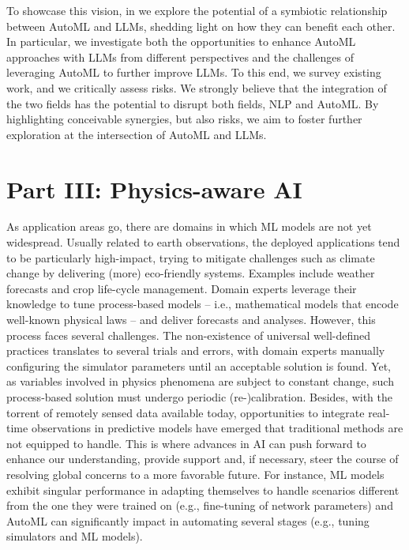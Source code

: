 To showcase this vision, in  we explore the potential of a symbiotic relationship between AutoML and LLMs, shedding light on how they can benefit each other.
In particular, we investigate both the opportunities to enhance AutoML approaches with LLMs from different perspectives and the challenges of leveraging AutoML to further improve LLMs.
To this end, we survey existing work, and we critically assess risks.
We strongly believe that the integration of the two fields has the potential to disrupt both fields, NLP and AutoML.
By highlighting conceivable synergies, but also risks, we aim to foster further exploration at the intersection of AutoML and LLMs.

\section*{Part III: Physics-aware AI}

As application areas go, there are domains in which ML models are not yet widespread.
Usually related to earth observations, the deployed applications tend to be particularly high-impact, trying to mitigate challenges such as climate change by delivering (more) eco-friendly systems.
Examples include weather forecasts and crop life-cycle management.
Domain experts leverage their knowledge to tune process-based models -- i.e., mathematical models that encode well-known physical laws -- and deliver forecasts and analyses.
However, this process faces several challenges.
The non-existence of universal well-defined practices translates to several trials and errors, with domain experts manually configuring the simulator parameters until an acceptable solution is found.
Yet, as variables involved in physics phenomena are subject to constant change, such process-based solution must undergo periodic (re-)calibration.
Besides, with the torrent of remotely sensed data available today, opportunities to integrate real-time observations in predictive models have emerged that traditional methods are not equipped to handle.
This is where advances in AI can push forward to enhance our understanding, provide support and, if necessary, steer the course of resolving global concerns to a more favorable future.
For instance, ML models exhibit singular performance in adapting themselves to handle scenarios different from the one they were trained on (e.g., fine-tuning of network parameters) and AutoML can significantly impact in automating several stages (e.g., tuning simulators and ML models).

